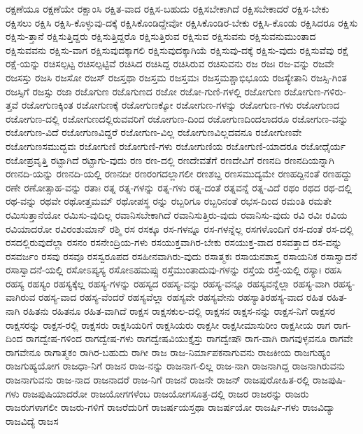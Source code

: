 {ರಕ್ಷಣೆಯೂ
ರಕ್ಷಣೆಯೇ
ರಕ್ಷಾಂಸಿ
ರಕ್ಷಿತ-ವಾದ
ರಕ್ಷಿಸ-ಬಹುದು
ರಕ್ಷಿಸಬೇಕಾಗಿದೆ
ರಕ್ಷಿಸಬೇಕಾದರೆ
ರಕ್ಷಿಸ-ಬೇಕು
ರಕ್ಷಿಸಲು
ರಕ್ಷಿಸಿ
ರಕ್ಷಿಸಿ-ಕೊಳ್ಳುವು-ದಕ್ಕೆ
ರಕ್ಷಿಸಿಕೊಂಡಿದ್ದೇವೋ
ರಕ್ಷಿಸಿಕೊಂಡಿರ-ಬೇಕು
ರಕ್ಷಿಸಿ-ಕೊಂಡು
ರಕ್ಷಿಸಿದರೂ
ರಕ್ಷಿಸು
ರಕ್ಷಿಸು-ತ್ತಾನೆ
ರಕ್ಷಿಸುತ್ತಿದ್ದರು
ರಕ್ಷಿಸುತ್ತಿದ್ದರೊ
ರಕ್ಷಿಸುತ್ತಿರುವ
ರಕ್ಷಿಸುವ
ರಕ್ಷಿಸುವನು
ರಕ್ಷಿಸುವನುಮುಂತಾದ
ರಕ್ಷಿಸುವವನು
ರಕ್ಷಿಸು-ವಾಗ
ರಕ್ಷಿಸುವುದಕ್ಕಾಗಲಿ
ರಕ್ಷಿಸುವುದಕ್ಕಾಗಿಯೆ
ರಕ್ಷಿಸುವು-ದಕ್ಕೆ
ರಕ್ಷಿಸು-ವುದು
ರಕ್ಷಿಸುವೆವು
ರಕ್ಷೆ
ರಕ್ಷೆ-ಯನ್ನು
ರಚಿಸಲ್ಪಟ್ಟ
ರಚಿಸಲ್ಪಟ್ಟಿವೆ
ರಚಿಸಿದ
ರಚಿಸಿದ್ದ
ರಚಿಸಿರುವ
ರಚಿಸುವನು
ರಜ
ರಜಃ
ರಜ-ವನ್ನು
ರಜವೇ
ರಜಸಸ್ತು
ರಜಸಿ
ರಜಸೋ
ರಜಸ್
ರಜಸ್ತಥಾ
ರಜಸ್ತಮ
ರಜಸ್ತಮಃ
ರಜಸ್ತಮಶ್ಚಾಭಿಭೂಯ
ರಜಸ್ಯೇತಾನಿ
ರಜಸ್ಸಿ-ಗಿಂತ
ರಜಸ್ಸಿಗೆ
ರಜಸ್ಸು
ರಜಾ
ರಜೊಗುಣ
ರಜೊಗುಣದ
ರಜೋ
ರಜೋ-ಗುಣಿ-ಗಳಲ್ಲಿ
ರಜೋಗುಣ
ರಜೋಗುಣ-ಗಳಿರು-ತ್ತವೆ
ರಜೋಗುಣಕ್ಕಿಂತ
ರಜೋಗುಣಕ್ಕೆ
ರಜೋಗುಣಕ್ಕೋ
ರಜೋಗುಣ-ಗಳನ್ನು
ರಜೋಗುಣ-ಗಳು
ರಜೋಗುಣದ
ರಜೋಗುಣ-ದಲ್ಲಿ
ರಜೋಗುಣದಲ್ಲಿರುವವರಿಗೆ
ರಜೋಗುಣ-ದಿಂದ
ರಜೋಗುಣದಿಂದಲಾದರೂ
ರಜೋಗುಣ-ವನ್ನು
ರಜೋಗುಣ-ವಿದೆ
ರಜೋಗುಣವಿದ್ದರೆ
ರಜೋಗುಣ-ವಿಲ್ಲ
ರಜೋಗುಣವಿಲ್ಲದವನೂ
ರಜೋಗುಣವೇ
ರಜೋಗುಣಸಮುದ್ಭವಃ
ರಜೋಗುಣಿ
ರಜೋಗುಣಿ-ಗಳು
ರಜೋಗುಣಿಯ
ರಜೋಗುಣಿ-ಯಾದರೂ
ರಜೋಧೈರ್ಯ
ರಜೋಪ್ರವೃತ್ತಿ
ರಟ್ಟಾಗಿದೆ
ರಟ್ಟಾಗು-ವುದು
ರಣ
ರಣ-ದಲ್ಲಿ
ರಣದೇವತೆಗೆ
ರಣದೇವಿಗೆ
ರಣನದಿ
ರಣನದಿಯನ್ನಾಗಿ
ರಣನದಿ-ಯನ್ನು
ರಣನದಿ-ಯಲ್ಲಿ
ರಣನದೀ
ರಣರಂಗದಲ್ಲಾಗಲೀ
ರಣಶಬ್ದ
ರಣಸಮುದ್ಯಮೇ
ರಣಹದ್ದಿನಂತೆ
ರಣಹದ್ದು
ರಣೇ
ರಣೋತ್ಸಾಹ-ವನ್ನು
ರತಾಃ
ರತ್ನ
ರತ್ನ-ಗಳನ್ನು
ರತ್ನ-ಗಳು
ರತ್ನ-ದಂತೆ
ರತ್ನವನ್ನೆ
ರತ್ನ-ವಿದೆ
ರಥಂ
ರಥದ
ರಥ-ದಲ್ಲಿ
ರಥ-ವನ್ನು
ರಥವೇ
ರಥೋತ್ತಮಮ್
ರಥೋಪಸ್ಥ
ರನ್ನು
ರಬ್ಬರಿಗೂ
ರಬ್ಬರಿನಂತೆ
ರಭಸ-ದಿಂದ
ರಮಂತಿ
ರಮತೇ
ರಮಿಸುತ್ತಾನೆಯೋ
ರಮಿಸು-ವುದಿಲ್ಲ
ರವಾನಿಸಬೇಕಾಗಿದೆ
ರವಾನಿಸುತ್ತಿರು-ವುದು
ರವಾನಿಸು-ವುದು
ರವಿ
ರವಿಃ
ರವಿಯ
ರವಿಯಾದರೋ
ರವಿರಂಶುಮಾನ್
ರಶ್ಮಿ
ರಸ
ರಸಕ್ಕೂ
ರಸ-ಗಳನ್ನೂ
ರಸ-ಗಳನ್ನೆಲ್ಲ
ರಸಗಳೊಂದಿಗೆ
ರಸ-ದಂತೆ
ರಸ-ದಲ್ಲಿ
ರಸದಲ್ಲಿರುವುದೆಲ್ಲಾ
ರಸನಂ
ರಸನೇಂದ್ರಿಯ-ಗಳು
ರಸಯುಕ್ತವಾಗಿರ-ಬೇಕು
ರಸಯುಕ್ತ-ವಾದ
ರಸವತ್ತಾದ
ರಸ-ವನ್ನು
ರಸವರ್ಜಂ
ರಸವು
ರಸವೂ
ರಸಸ್ವರೂಪದ
ರಸಹೀನವಾಗಿರು-ವುದು
ರಸಾತ್ಮಕಃ
ರಸಾಯನಶಾಸ್ತ್ರ
ರಸಾಯನಿಕ
ರಸಾಸ್ವಾದನೆ
ರಸಾಸ್ವಾದನೆ-ಯಲ್ಲಿ
ರಸೋಽಪ್ಯಸ್ಯ
ರಸೋಽಹಮಪ್ಸು
ರಸ್ತೆಮುಂತಾದುವು-ಗಳನ್ನು
ರಸ್ತೆಯ
ರಸ್ತೆ-ಯಲ್ಲಿ
ರಸ್ಯಾಃ
ರಹಸಿ
ರಹಸ್ಯ
ರಹಸ್ಯಂ
ರಹಸ್ಯಕ್ಕೆಲ್ಲ
ರಹಸ್ಯ-ಗಳನ್ನು
ರಹಸ್ಯದ
ರಹಸ್ಯ-ವನ್ನು
ರಹಸ್ಯ-ವನ್ನೂ
ರಹಸ್ಯವನ್ನೆಲ್ಲಾ
ರಹಸ್ಯ-ವಾಗಿ
ರಹಸ್ಯ-ವಾಗಿರುವ
ರಹಸ್ಯ-ವಾದ
ರಹಸ್ಯ-ವೆಂದರೆ
ರಹಸ್ಯವೆಲ್ಲಾ
ರಹಸ್ಯವೇ
ರಹಸ್ಯವೇನು
ರಹಸ್ಯಾತಿರಹಸ್ಯ-ವಾದ
ರಹಿತ
ರಹಿತ-ನಾಗಿ
ರಹಿತನು
ರಹಿತನೂ
ರಹಿತ-ವಾಗಿದೆ
ರಾಕ್ಷಸ
ರಾಕ್ಷಸಕುಲ-ದಲ್ಲಿ
ರಾಕ್ಷಸನ
ರಾಕ್ಷಸ-ನನ್ನು
ರಾಕ್ಷಸ-ನಿಗೆ
ರಾಕ್ಷಸರ
ರಾಕ್ಷಸರನ್ನು
ರಾಕ್ಷಸ-ರಲ್ಲಿ
ರಾಕ್ಷಸರು
ರಾಕ್ಷಸಿಯರಿಗೆ
ರಾಕ್ಷಸಿಯರು
ರಾಕ್ಷಸೀ
ರಾಕ್ಷಸೀಮಾಸುರೀಂ
ರಾಕ್ಷಸೀಯ
ರಾಗ
ರಾಗ-ದಿಂದ
ರಾಗದ್ವೇಷ-ಗಳಿಂದ
ರಾಗದ್ವೇಷ-ಗಳು
ರಾಗದ್ವೇಷವಿಯುಕ್ತೈಸ್ತು
ರಾಗದ್ವೇಷೌ
ರಾಗ-ವಾಗಿ
ರಾಗವುಳ್ಳವನೂ
ರಾಗವೇ
ರಾಗವೇನೂ
ರಾಗಾತ್ಮಕಂ
ರಾಗಿರ-ಬಹುದು
ರಾಗೀ
ರಾಜ
ರಾಜ-ನಿರ್ಮಾಪಕನಾಗುವನು
ರಾಜಕೀಯ
ರಾಜಗುಹ್ಯಂ
ರಾಜಗುಹ್ಯಯೋಗ
ರಾಜಧಾ-ನಿಗೆ
ರಾಜನ
ರಾಜ-ನನ್ನು
ರಾಜನಾಗ-ಲಿಲ್ಲ
ರಾಜ-ನಾಗಿ
ರಾಜನಾಗಿದ್ದ
ರಾಜನಾಗಿರುವನು
ರಾಜನಾಗುವನು
ರಾಜ-ನಾದ
ರಾಜನಾದರೆ
ರಾಜ-ನಿಗೆ
ರಾಜನೆ
ರಾಜನೇ
ರಾಜನ್
ರಾಜಪುರೋಹಿತ-ರಲ್ಲಿ
ರಾಜಪುಷಿ-ಗಳು
ರಾಜಪುಷಿಯಾದರೋ
ರಾಜಯೋಗಗಳೆಂಬ
ರಾಜಯೋಗಸೂತ್ರ-ದಲ್ಲಿ
ರಾಜರ
ರಾಜರನ್ನು
ರಾಜರು
ರಾಜರುಗಳಾಗಲೀ
ರಾಜರು-ಗಳಿಗೆ
ರಾಜರೆದುರಿಗೆ
ರಾಜರ್ಷಯಸ್ತಥಾ
ರಾಜರ್ಷಯೋ
ರಾಜರ್ಷಿ-ಗಳು
ರಾಜವಿದ್ಯಾ
ರಾಜವಿದ್ಯೆ
ರಾಜಸ
}
